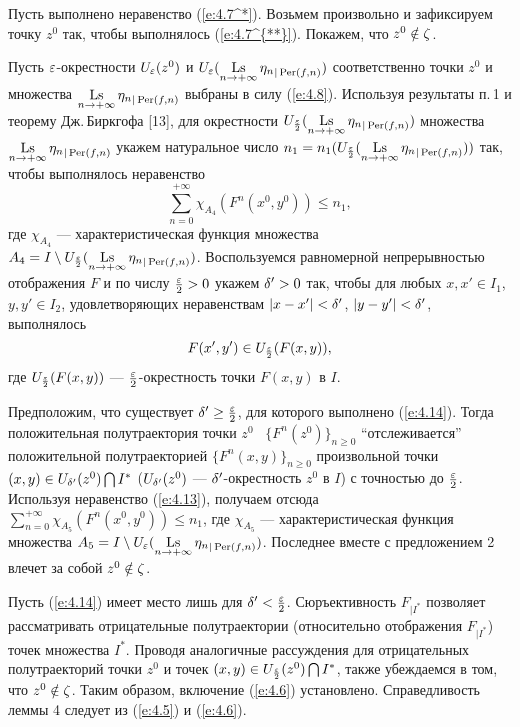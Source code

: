 \begin{pf}
Пусть выполнено неравенство (\ref{e:4.7^*}). Возьмем произвольно
и зафиксируем точку $z^0$ так, чтобы выполнялось (\ref{e:4.7^{**}}).
Покажем, что $z^0\notin\zeta$.

Пусть $\varepsilon$-окрестности $U_{\varepsilon}(z^0)$ и
$U_{\e}(\Ls\limits_{n\to +\infty}{\eta_n}_{|\Per(f, n)})$ соответственно
точки $z^0 $ и множества
$\Ls\limits_{n\to +\infty}{\eta_n}_{|
\Per(f, n)}$ выбраны в силу (\ref{e:4.8}).
Используя результаты п.\,1 и теорему Дж.\,Биркгофа [13],
для окрестности
$U_{\frac{\e}{2}}(\Ls\limits_{n\to +\infty}{\eta_n}_{|
\Per(f, n)})$ множества
$\Ls\limits_{n\to +\infty}{\eta_n}_{|
\Per(f, n)}$ укажем натуральное число
$n_1=n_1(U_{\frac{\e}{2}}(\Ls\limits_{n\to
+\infty}{\eta_n}_{| \Per(f, n)}))$ так, чтобы
выполнялось неравенство
\begin{equation}\label{e:4.13}
\sum\limits_{n=0}^{+\infty}\chi_{A_4}
(F^n(x^0, y^0))\leq n_1,
\end{equation}
где $\chi_{A_4}$ --- характеристическая функция
множества
$A_4=I\setminus U_{\frac{\e}{2}}(\Ls\limits_{n\to
+\infty}{\eta_n}_{| \Per(f, n)})$.
Воспользуемся равномерной непрерывностью отображения $F$ и
по числу $\frac{\varepsilon}{2}> 0$ укажем $\delta'> 0$ так, чтобы
для любых $x, x'\in I_1$, $y, y'\in I_2$, удовлетворяющих
неравенствам $|x - x'|<\delta'$, $|y - y'|<\delta'$, выполнялось
\begin{equation}\label{e:4.14}
F(x', y')\in U_{\frac{\varepsilon}{2}}(F(x, y)),
\end{equation}
где $U_{\frac{\varepsilon}{2}}(F(x, y))$ --- $\frac{\varepsilon}{2}$-окрестность
точки $F(x, y)$ в $I$.

Предположим, что существует $\delta'\geq\frac{\varepsilon}{2}$, для которого
выполнено (\ref{e:4.14}). Тогда положительная полутраектория
точки $z^0$  \  $\{F^n(z^0)\}_{n\geq 0}$ ``отслеживается''
положительной полутраекторией $\{F^n(x, y)\}_{n\geq 0}$
произвольной точки $(x, y)\in U_{\delta'}(z^0)\bigcap I^*$
($U_{\delta'}(z^0)$ --- $\delta'$-окрестность $z^0$ в $I$)
с точностью до $\frac{\varepsilon}{2}$.
Используя неравенство (\ref{e:4.13}), получаем отсюда
$\sum\limits_{n=0}^{+\infty}\chi_{A_5}(F^n(x^0, y^0))\leq n_1$,
где $\chi_{A_5}$ --- характеристическая функция множества
$A_5=I\setminus U_{\e}(\Ls\limits_{n\to
+\infty}{\eta_n}_{| \Per(f, n)})$.
Последнее вместе с предложением 2 влечет за собой
$z^0\notin\zeta$.

Пусть (\ref{e:4.14}) имеет место лишь для
$\delta'< \frac{\varepsilon}{2}$. Сюръективность $F_{| I^*}$ позволяет
рассматривать отрицательные полутраектории (относительно
отображения $F_{| I^*}$) точек множества $I^*$.
Проводя аналогичные рассуждения для
отрицательных полутраекторий точки $z^0$ и точек
$(x, y)\in U_{\frac{\varepsilon}{2}}(z^0)\bigcap I^*$, также
убеждаемся в том, что
$z^0\notin\zeta$.
Таким образом, включение (\ref{e:4.6}) установлено.
Справедливость леммы 4 следует из
(\ref{e:4.5}) и (\ref{e:4.6}).
\end{pf}

